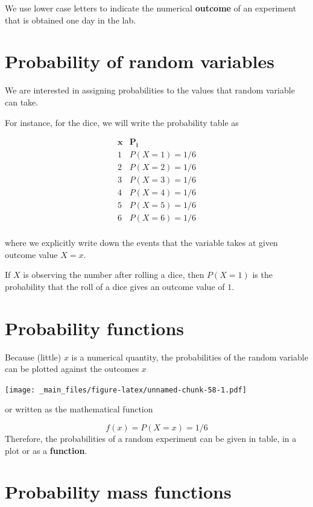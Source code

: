 \documentclass[
]{book}
\begin{document}
We use lower case letters to indicate the numerical \textbf{outcome} of an experiment that is obtained one day in the lab.

\hypertarget{probability-of-random-variables}{%
\section{Probability of random variables}\label{probability-of-random-variables}}

We are interested in assigning probabilities to the values that random variable can take.

For instance, for the dice, we will write the probability table as

\[
\begin{array}{cc}
\mathbf{x} & \mathbf{P_i} \\
1 & P(X=1) = 1/6 \\
2 & P(X=2) = 1/6 \\
3 & P(X=3) = 1/6 \\
4 & P(X=4) = 1/6 \\
5 & P(X=5) = 1/6 \\
6 & P(X=6) = 1/6 \\
\end{array}
\]

where we explicitly write down the events that the variable takes at given outcome value \(X=x\).

If \(X\) is observing the number after rolling a dice, then \(P(X=1)\) is the probability that the roll of a dice gives an outcome value of \(1\).

\hypertarget{probability-functions}{%
\section{Probability functions}\label{probability-functions}}

Because (little) \(x\) is a numerical quantity, the probabilities of the random variable can be plotted against the outcomes \(x\)

\texttt{[image: \_main\_files/figure-latex/unnamed-chunk-58-1.pdf]}

or written as the mathematical function

\[f(x)=P(X=x)=1/6\]
Therefore, the probabilities of a random experiment can be given in table, in a plot or as a \textbf{function}.

\hypertarget{probability-mass-functions}{%
\section{Probability mass functions}\label{probability-mass-functions}}
\end{document}
